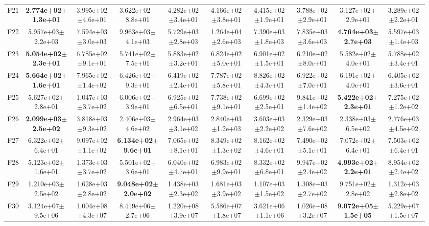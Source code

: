 \begin{table}[t]
\begin{tabular}{cccccccccc}
F21 & \textbf{2.774e+02$\pm$1.3e+01} & 3.995e+02$\pm$4.6e+01 & 3.622e+02$\pm$8.8e+01 & 4.282e+02$\pm$3.4e+01 & 4.166e+02$\pm$3.8e+01 & 4.415e+02$\pm$1.9e+01 & 3.788e+02$\pm$2.9e+01 & 3.127e+02$\pm$2.9e+01 & 3.289e+02$\pm$2.2e+01 \\
F22 & 5.957e+03$\pm$2.2e+03 & 7.594e+03$\pm$3.0e+03 & 9.963e+03$\pm$4.1e+03 & 5.729e+03$\pm$2.8e+03 & 1.264e+04$\pm$2.6e+03 & 7.390e+03$\pm$1.8e+03 & 7.835e+03$\pm$3.6e+03 & \textbf{4.764e+03$\pm$2.7e+03} & 5.597e+03$\pm$1.4e+03 \\
F23 & \textbf{5.054e+02$\pm$2.3e+01} & 6.785e+02$\pm$9.1e+01 & 5.741e+02$\pm$7.5e+01 & 5.883e+02$\pm$3.2e+01 & 6.824e+02$\pm$5.0e+01 & 6.901e+02$\pm$1.5e+01 & 6.210e+02$\pm$8.0e+01 & 5.582e+02$\pm$4.0e+01 & 5.788e+02$\pm$3.4e+01 \\
F24 & \textbf{5.664e+02$\pm$1.6e+01} & 7.965e+02$\pm$1.4e+02 & 6.426e+02$\pm$9.3e+01 & 6.419e+02$\pm$2.4e+01 & 7.787e+02$\pm$5.8e+01 & 8.826e+02$\pm$4.3e+01 & 6.922e+02$\pm$7.0e+01 & 6.191e+02$\pm$4.0e+01 & 6.405e+02$\pm$3.6e+01 \\
F25 & 5.627e+02$\pm$2.8e+01 & 1.047e+03$\pm$3.7e+02 & 6.006e+02$\pm$3.9e+01 & 6.925e+02$\pm$6.5e+01 & 7.738e+02$\pm$9.1e+01 & 6.699e+02$\pm$2.5e+01 & 9.841e+02$\pm$1.4e+02 & \textbf{5.422e+02$\pm$2.3e+01} & 7.275e+02$\pm$1.2e+02 \\
F26 & \textbf{2.099e+03$\pm$2.5e+02} & 3.818e+03$\pm$9.3e+02 & 2.406e+03$\pm$4.6e+02 & 2.964e+03$\pm$3.1e+02 & 2.840e+03$\pm$1.2e+03 & 3.603e+03$\pm$2.2e+02 & 2.329e+03$\pm$7.6e+02 & 2.338e+03$\pm$6.5e+02 & 2.776e+03$\pm$4.5e+02 \\
F27 & 6.322e+02$\pm$6.4e+01 & 9.097e+02$\pm$1.1e+02 & \textbf{6.134e+02$\pm$9.6e+01} & 7.065e+02$\pm$8.1e+01 & 8.349e+02$\pm$1.3e+02 & 8.162e+02$\pm$4.6e+01 & 7.490e+02$\pm$5.1e+01 & 7.072e+02$\pm$6.4e+01 & 7.503e+02$\pm$6.4e+01 \\
F28 & 5.123e+02$\pm$1.6e+01 & 1.373e+03$\pm$3.7e+02 & 5.501e+02$\pm$3.6e+01 & 6.040e+02$\pm$4.7e+01 & 6.983e+02$\pm$9.9e+01 & 8.332e+02$\pm$6.8e+01 & 9.947e+02$\pm$2.4e+02 & \textbf{4.993e+02$\pm$2.2e+01} & 8.954e+02$\pm$2.4e+02 \\
F29 & 1.210e+03$\pm$2.5e+02 & 1.628e+03$\pm$2.8e+02 & \textbf{9.048e+02$\pm$2.0e+02} & 1.438e+03$\pm$2.3e+02 & 1.681e+03$\pm$3.9e+02 & 1.107e+03$\pm$1.5e+02 & 1.308e+03$\pm$2.7e+02 & 9.751e+02$\pm$2.8e+02 & 1.312e+03$\pm$2.8e+02 \\
F30 & 3.124e+07$\pm$9.5e+06 & 1.004e+08$\pm$4.3e+07 & 8.419e+06$\pm$2.7e+06 & 1.220e+08$\pm$3.9e+07 & 5.586e+07$\pm$1.8e+07 & 3.621e+06$\pm$1.1e+06 & 1.026e+08$\pm$3.2e+07 & \textbf{9.072e+05$\pm$1.5e+05} & 5.229e+07$\pm$1.5e+07 \\
\hline
\end{tabular}
\end{table}
